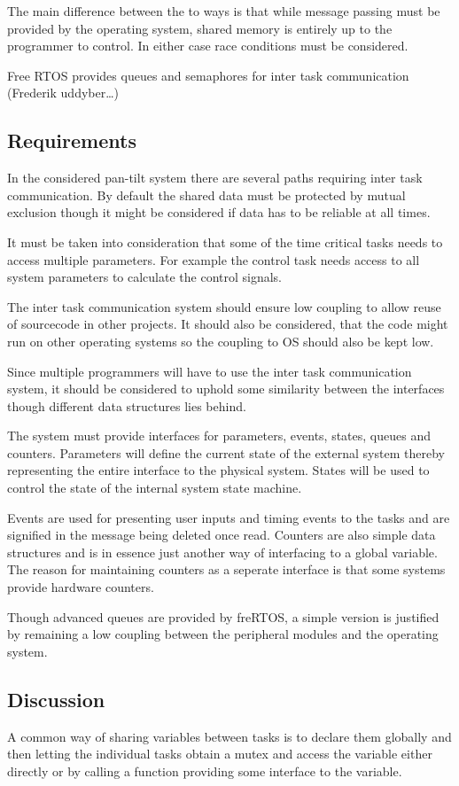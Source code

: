 The main difference between the to ways is that while message passing must be
provided by the operating system, shared memory is entirely up to the programmer
to control. In either case race conditions must be considered.

Free RTOS provides queues and semaphores for inter task communication (Frederik
uddyber\ldots)

\subsection{Requirements}
In the considered pan-tilt system there are several paths requiring inter task
communication. By default the shared data must be protected by mutual exclusion
though it might be considered if data has to be reliable at all times.

 It must be taken into consideration that some of the time critical tasks needs
 to access multiple parameters. For example the control task needs access to all
 system parameters to calculate the control signals.
 
 The inter task communication system should ensure low coupling to allow reuse
 of sourcecode in other projects. It should also be considered, that the code
 might run on other operating systems so the coupling to OS should also be kept
 low.
 
 Since multiple programmers will have to use the inter task communication
 system, it should be considered to uphold some similarity between the
 interfaces though different data structures lies behind.
 
 The system must provide interfaces for parameters, events, states, queues
and counters. Parameters will define the current state of the external system
thereby representing the entire interface to the physical system. States will be
used to control the state of the internal system state machine.

Events are used for presenting user inputs and timing events to the tasks and
are signified in the message being deleted once read. Counters are also simple
data structures and is in essence just another way of interfacing to a global
variable. The reason for maintaining counters as a seperate interface is that
some systems provide hardware counters.

Though advanced queues are provided by freRTOS, a simple version is justified by
remaining a low coupling between the peripheral modules and the operating
system.

\subsection{Discussion}
A common way of sharing variables between tasks is to declare them globally and
then letting the individual tasks obtain a mutex and access the variable either
directly or by calling a function providing some interface to the variable.

